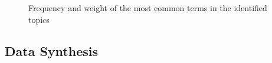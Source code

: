 \documentclass[conference]{IEEEtran}
\begin{document}
\begin{figure}[!htbp]
    \caption{\label{fig:topics_wordcount}Frequency and weight of the most common terms in the identified topics}
\end{figure}

\subsection{Data Synthesis}
\end{document}
